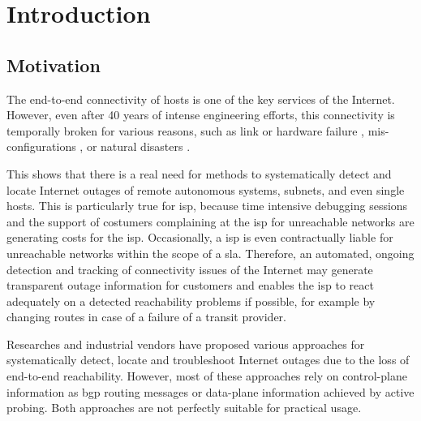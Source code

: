 \chapter{Introduction\label{Introduction}}
\section{Motivation}

The end-to-end connectivity of hosts is one of the key services of the Internet.
However, even after 40 years of intense engineering efforts, this connectivity
is temporally broken for various reasons, such as link or hardware failure
\citep{Markopoulou:2008}, mis-configurations \citep{Mahajan:2002}, or natural
disasters \citep{Dainotti:2012:EBH,Schulman:2011}.

This shows that there is a real need for methods to systematically detect and
locate Internet outages of remote autonomous systems, subnets, and even single
hosts. This is particularly true for \gls{isp}, because time intensive debugging 
sessions and the support of costumers complaining at the \gls{isp} for 
unreachable networks are generating costs for the \gls{isp}. Occasionally, a 
\gls{isp} is even contractually liable for unreachable networks within the 
scope of a \gls{sla}. Therefore, an automated, ongoing detection and tracking of 
connectivity issues of the Internet may generate transparent outage information 
for customers and enables the \gls{isp} to react adequately on a detected 
reachability problems if possible, for example by changing routes in case of a 
failure of a transit provider. 

Researches and industrial vendors have proposed various approaches for
systematically detect, locate and troubleshoot Internet outages due to the loss 
of end-to-end reachability.
However, most of these approaches rely on \gls{control-plane} information as 
\gls{bgp} routing messages or \gls{data-plane} information achieved by active 
probing. Both approaches are not perfectly suitable for practical usage.

